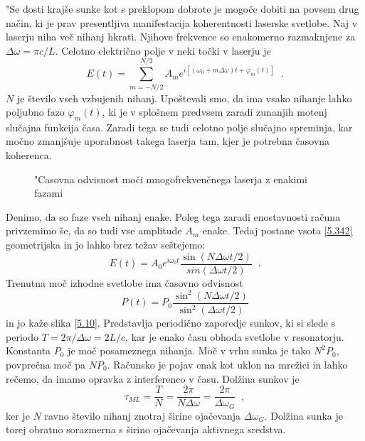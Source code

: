 "Se dosti krajše sunke kot s preklopom dobrote je mogoče dobiti na
povsem drug način, ki je prav presentljiva manifestacija koherentnosti
laserske svetlobe. Naj v laserju niha več nihanj hkrati. Njihove frekvence
so enakomerno razmaknjene za $\Delta \omega =\pi c/L$. Celotno električno
polje v neki točki v laserju je 
\begin{equation}
E(t)=\sum_{m=-N/2}^{N/2}A_{m}e^{i[(\omega _{0}+m\Delta \omega )t+\varphi
_{m}(t)]}\;\;.  \label{5.342}
\end{equation}
$N$ je število vseh vzbujenih nihanj. Upoštevali smo, da ima vsako
nihanje lahko poljubno fazo $\varphi _{m}(t)$, ki je v splošnem predvsem
zaradi zunanjih motenj slučajna funkcija časa. Zaradi tega se tudi
celotno polje slučajno spreminja, kar močno zmanjšuje uporabnost
takega laserja tam, kjer je potrebna časovna koherenca.

\begin{figure}[tbp]
\label{s5.10} \vskip 5cm
\caption{"Casovna odvisnost moči mnogofrekvenčnega laserja z enakimi
fazami }
\end{figure}

Denimo, da so faze vseh nihanj enake. Poleg tega zaradi enostavnosti
računa privzemimo še, da so tudi vse amplitude $A_{m}$ enake. Tedaj
postane vsota \ref{5.342} geometrijska in jo lahko brez težav seštejemo: 
\begin{equation}
E(t)=A_{0}e^{i\omega _{0}t}\frac{\sin (N\Delta \omega t/2)}{sin(\Delta
\omega t/2)}\;\;.  \label{5.352}
\end{equation}
Trenutna moč izhodne svetlobe ima časovno odvisnost 
\begin{equation}
P(t)=P_{0}\frac{\sin ^{2}(N\Delta \omega t/2)}{\sin ^{2}(\Delta \omega t/2)}
\label{5.36}
\end{equation}
in jo kaže slika \ref{5.10}. Predstavlja periodično zaporedje sunkov, ki
si slede s periodo $T=2\pi /\Delta \omega =2L/c$, kar je enako času obhoda
svetlobe v resonatorju. Konstanta $P_{0}$ je moč posameznega nihanja.
Moč v vrhu sunka je tako $N^{2}P_{0}$, povprečna moč pa $NP_{0}$.
Računsko je pojav enak kot uklon na mrežici in lahko rečemo, da imamo
opravka z interferenco v času. Dolžina sunkov je 
\begin{equation}
\tau _{ML}=\frac{T}{N}=\frac{2\pi }{N\Delta \omega }=\frac{2\pi }{\Delta
\omega _{G}}\;\;,  \label{5.37}
\end{equation}
ker je $N$ ravno število nihanj znotraj širine ojačevanja $\Delta
\omega _{G}$. Dolžina sunka je torej obratno sorazmerna s širino
ojačevanja aktivnega sredstva.

